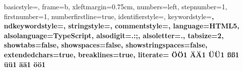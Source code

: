  {%
  basicstyle={\footnotesize\ttfamily},   
  frame=b,
  xleftmargin={0.75cm},
  numbers=left,
  stepnumber=1,
  firstnumber=1,
  numberfirstline=true, 
  identifierstyle=\color{black},
  keywordstyle=\color{blue}\bfseries,
  ndkeywordstyle=\color{editorGreen}\bfseries,
  stringstyle=\color{editorOcher}\ttfamily,
  commentstyle=\color{brown}\ttfamily,
  language=HTML5,
  alsolanguage=TypeScript,
  alsodigit={.:;},
  alsoletter={.},
  tabsize=2,
  showtabs=false,
  showspaces=false,
  showstringspaces=false,
  extendedchars=true,
  breaklines=true,
  literate=%
  {Ö}{{\"O}}1
  {Ä}{{\"A}}1
  {Ü}{{\"U}}1
  {ß}{{\ss}}1
  {ü}{{\"u}}1
  {ä}{{\"a}}1
  {ö}{{\"o}}1
}
\makeatletter
\setcounter{tocdepth}{4}
\setcounter{secnumdepth}{4}
\renewcommand{\lstlistingname}{Code-Ausschnitt}
\usepackage{subcaption}
\usepackage{layouts}